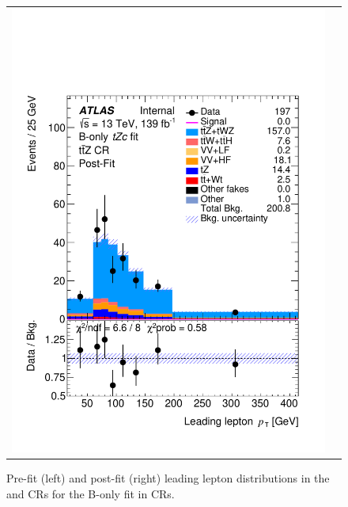 \begin{figure}[htbp]
\begin{tabular}{cc}
		\includegraphics[width=.45\textwidth]{Chapters/CH7/figures/BONLY_CR_UsingDL1rcFullSys/Plots/TTZCR_postFit} \\
	\end{tabular}
	\caption{Pre-fit (left) and post-fit (right) leading lepton \pt distributions in the \ttbar and \ttZ CRs for the B-only \tZc fit in CRs.
		\ErrStatSys
	}%
	\label{fig:stat:tzc:bonly:cr:crplots:2}
\end{figure}
